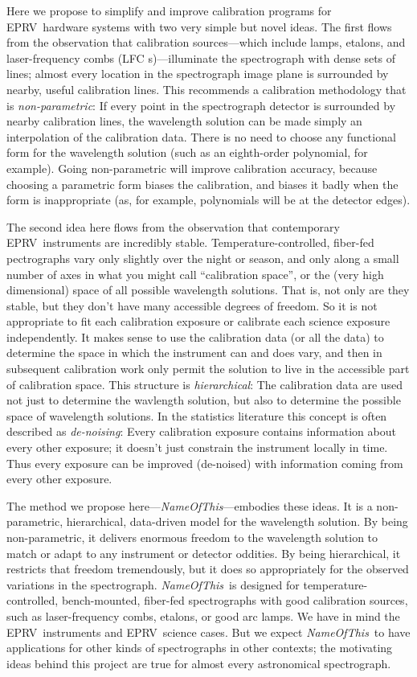 \documentclass[12pt, letterpaper]{article}
\newcommand{\project}[1]{\textsl{#1}}
\newcommand{\acronym}[1]{{\small{#1}}}
\newcommand{\name}{\project{NameOfThis}}
\newcommand{\eprv}{\acronym{EPRV}}
\newcommand{\lfc}{\acronym{LFC}}
\begin{document}
Here we propose to simplify and improve calibration programs for
\eprv\ hardware systems with two very simple but novel ideas.
The first flows from the observation that calibration sources---which
include lamps, etalons, and laser-frequency combs (\lfc
s)---illuminate the spectrograph with dense sets of lines; almost every
location in the spectrograph image plane is surrounded by nearby,
useful calibration lines.
This recommends a calibration methodology that is
\emph{non-parametric}:
If every point in the spectrograph detector is surrounded by nearby
calibration lines, the wavelength solution can be made simply an
interpolation of the calibration data.
There is no need to choose any functional form for the wavelength
solution (such as an eighth-order polynomial, for example).
Going non-parametric will improve calibration accuracy, because
choosing a parametric form biases the calibration, and biases it
badly when the form is inappropriate (as, for example, polynomials
will be at the detector edges).

The second idea here flows from the observation that contemporary
\eprv\ instruments are incredibly stable.
Temperature-controlled, fiber-fed pectrographs vary only slightly over
the night or season, and only along a small number of axes in what you
might call ``calibration space'', or the (very high dimensional) space
of all possible wavelength solutions.
That is, not only are they stable, but they don't have many accessible
degrees of freedom.
So it is not appropriate to fit each calibration exposure or calibrate
each science exposure independently.
It makes sense to use the calibration data (or all the data) to
determine the space in which the instrument can and does vary, and
then in subsequent calibration work only permit the solution to live
in the accessible part of calibration space.
This structure is \emph{hierarchical}: The calibration data are used
not just to determine the wavlength solution, but also to determine
the possible space of wavelength solutions.
In the statistics literature this concept is often described as
\emph{de-noising}:
Every calibration exposure contains information about every other
exposure; it doesn't just constrain the instrument locally in time.
Thus every exposure can be improved (de-noised) with information
coming from every other exposure.

The method we propose here---\name---embodies these ideas.
It is a non-parametric, hierarchical, data-driven model for the
wavelength solution.
By being non-parametric, it delivers enormous freedom to the
wavelength solution to match or adapt to any instrument or detector
oddities.
By being hierarchical, it restricts that freedom tremendously, but it
does so appropriately for the observed variations in the
spectrograph.
\name\ is designed for temperature-controlled, bench-mounted, fiber-fed
spectrographs with good calibration sources, such as laser-frequency
combs, etalons, or good arc lamps.
We have in mind the \eprv\ instruments and \eprv\ science cases.
But we expect \name\ to have applications for other kinds of
spectrographs in other contexts; the motivating ideas behind this
project are true for almost every astronomical spectrograph.
\end{document}
